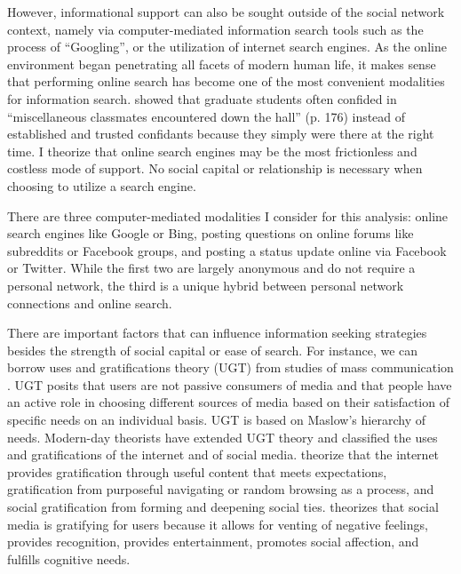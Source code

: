 However, informational support can also be sought outside of the social network
context, namely via computer-mediated information search tools such as the
process of ``Googling'', or the utilization of internet search engines. As the
online environment began penetrating all facets of modern human life, it makes
sense that performing online search has become one of the most convenient
modalities for information search. \citet{smallSomeoneTalk2017} showed
that graduate students often confided in ``miscellaneous classmates encountered
down the hall'' (p. 176) instead of established and trusted confidants because
they simply were there at the right time. 
I theorize that online search engines
may be the most frictionless and costless mode of support. No social capital or
relationship is necessary when choosing to utilize a search engine. 

There are three computer-mediated modalities I consider for this analysis: online
search engines like Google or Bing, posting questions on online forums like
subreddits or Facebook groups, and posting a status update online via Facebook
or Twitter. While the first two are largely anonymous and do not require a
personal network, the third is a unique hybrid between personal network
connections and online search.

There are important factors that can influence information seeking strategies
besides the strength of social capital or ease of search. For instance, we can
borrow uses and gratifications theory (UGT) from studies of mass communication
\citep{blumlerUsesMassCommunications1974, tanMassCommunicationTheories1985}. UGT
posits that users are not passive consumers of media and that people have an
active role in choosing different sources of media based on their satisfaction
of specific needs on an individual basis. UGT is based on Maslow’s
\citeyear{maslowTheoryHumanMotivation1943} hierarchy of needs.
Modern-day theorists have extended UGT theory
and classified the uses and gratifications of the internet and of social media.
\citet{staffordDeterminingUsesGratifications2004} theorize that the internet
provides gratification through useful content that meets expectations,
gratification from purposeful navigating or random browsing as a process, and
social gratification from forming and deepening social ties.
\citet{leungGenerationalDifferencesContent2013} theorizes that social media is
gratifying for users because it allows for venting of negative feelings,
provides recognition, provides entertainment, promotes social affection, and
fulfills cognitive needs.

